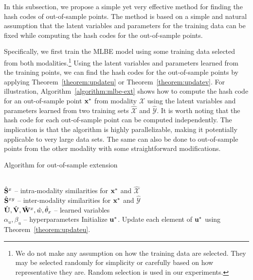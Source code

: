 In this subsection, we propose a simple yet very effective method for finding the hash codes of out-of-sample points.  The method is based on a simple and natural assumption that the latent variables and parameters for the training data can be fixed while computing the hash codes for the out-of-sample points.

Specifically, we first train the \mbox{MLBE} model using some 
training data selected from both modalities.\footnote{We do not make any assumption on how the training data are selected.  They may be selected randomly for simplicity or carefully based on how representative they are.  Random selection is used in our experiments.}
Using the latent variables and parameters learned from the training points, we can find the hash codes for the out-of-sample points by applying Theorem~\ref{theorem:updateu} or Theorem~\ref{theorem:updatev}.  For illustration, Algorithm~\ref{algorithm:mlbe-ext} shows how to compute the hash code for an out-of-sample point $\x^{*}$ from modality $\mathcal{X}$ using the latent variables and parameters learned from two training sets $\hat{\mathcal{X} }$ and $\hat{\mathcal{Y} }$.  It is worth noting that the hash code for each out-of-sample point can be computed independently.  The implication is that the algorithm is highly parallelizable, making it potentially applicable to very large data sets.  The same can also be done to out-of-sample points from the other modality with some straightforward modifications.


\begin{algorithm}[ht]
\caption{Algorithm for out-of-sample extension}
\label{algorithm:mlbe-ext} %
\begin{algorithmic}
 \\
$\hat{\S}^{x}$ -- intra-modality similarities for $\x^{*}$ and $\hat{\mathcal{X} }$
\\$\hat{\S}^{xy}$ -- inter-modality similarities for $\x^{*}$ and $\hat{\mathcal{Y} }$
\\$\hat{\U},\hat{\V},\hat{\W}^{x},\hat{w},\hat{\theta}_x $ -- learned variables
\\$\alpha_u,\beta_u$ --  hyperparameters
   \STATE Initialize $ \u^{*}  $.
   \STATE Update each element of $ \u^{*}  $ using Theorem~\ref{theorem:updateu}.
   \ENDWHILE

\end{algorithmic}
\end{algorithm}
\vspace{-0.3cm}

